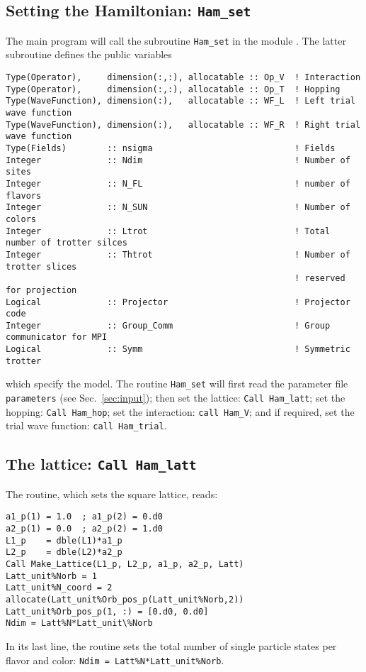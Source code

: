 \subsection{Setting the Hamiltonian:  \texttt{Ham\_set} }

The main program will call the subroutine \texttt{Ham\_set} in the module .
The latter  subroutine  defines the  public variables
\begin{lstlisting}[style=fortran]
Type(Operator),     dimension(:,:), allocatable :: Op_V  ! Interaction
Type(Operator),     dimension(:,:), allocatable :: Op_T  ! Hopping
Type(WaveFunction), dimension(:),   allocatable :: WF_L  ! Left trial wave function
Type(WaveFunction), dimension(:),   allocatable :: WF_R  ! Right trial wave function
Type(Fields)        :: nsigma                            ! Fields
Integer             :: Ndim                              ! Number of sites
Integer             :: N_FL                              ! number of flavors
Integer             :: N_SUN	                         ! Number of colors 
Integer             :: Ltrot                             ! Total number of trotter silces
Integer             :: Thtrot                            ! Number of trotter slices 
                                                         ! reserved for projection
Logical             :: Projector                         ! Projector code
Integer             :: Group_Comm                        ! Group communicator for MPI
Logical             :: Symm                              ! Symmetric trotter 
\end{lstlisting}
which specify the model.  The  routine \texttt{Ham\_set}  will first  read the parameter file \texttt{parameters} (see Sec.~\ref{sec:input}); then set the lattice: \texttt{Call Ham\_latt};  set the hopping: \texttt{Call Ham\_hop};  
 set the interaction: \texttt{call Ham\_V}; and if required, set the trial wave function: \texttt{call Ham\_trial}.

\subsection{The lattice:   \texttt{Call Ham\_latt} }  \label{U_PV_Ham_latt}

The routine, which sets the square lattice, reads:
\begin{lstlisting}[style=fortran]
a1_p(1) = 1.0  ; a1_p(2) = 0.d0
a2_p(1) = 0.0  ; a2_p(2) = 1.d0
L1_p    = dble(L1)*a1_p
L2_p    = dble(L2)*a2_p
Call Make_Lattice(L1_p, L2_p, a1_p, a2_p, Latt)
Latt_unit%Norb = 1
Latt_unit%N_coord = 2
allocate(Latt_unit%Orb_pos_p(Latt_unit%Norb,2))
Latt_unit%Orb_pos_p(1, :) = [0.d0, 0.d0]
Ndim = Latt%N*Latt_unit\%Norb

\end{lstlisting}
In its last line, the routine sets the total number of single particle states per flavor and color:
\texttt{Ndim = Latt\%N*Latt\_unit\%Norb}.

